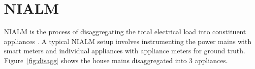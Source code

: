 \documentclass[conference]{IEEEtran}
\newcommand{\figref}[1]{Figure~\ref{#1}}
\begin{document}



\section{NIALM}
NIALM is the process of disaggregating the total electrical load into constituent appliances \cite{hart}. A typical NIALM setup involves instrumenting the power mains with smart meters and individual appliances with appliance meters for ground truth. \figref{fig:disagg} shows the house mains disaggregated into 3 appliances.
\end{document}
